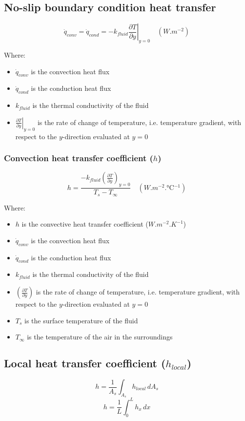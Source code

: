 \documentclass[11pt]{article}
\begin{document}
\subsection{No-slip boundary condition heat transfer}
\label{sec:orgc209fd6}
\[\dot{q}_{conv} = \dot{q}_{cond} = - k_{fluid} \left. \frac{\partial T}{\partial y} \right|_{y = 0} \quad (\unit{W.m^{-2}})\]

Where:
\begin{itemize}
\item \(\dot{q}_{conv}\) is the convection heat flux
\item \(\dot{q}_{cond}\) is the conduction heat flux
\item \(k_{fluid}\) is the thermal conductivity of the fluid
\item \(\left. \frac{\partial T}{\partial y} \right|_{y = 0}\) is the rate of change of temperature, i.e. temperature gradient, with respect to the \(y\)-direction evaluated at \(y = 0\)
\end{itemize}
\subsubsection{Convection heat transfer coefficient (\(h\))}
\label{sec:orgf4f2e16}
\[h = \frac{-k_{fluid} \left(\frac{\partial T}{\partial y} \right)_{y=0}}{T_s - T_{\infty}} \quad (\unit{W.m^{-2}.\degreeCelsius^{-1}})\]

Where:
\begin{itemize}
\item \(h\) is the convective heat transfer coefficient (\(\unit{W.m^{-2}.K^{-1}}\))
\item \(\dot{q}_{conv}\) is the convection heat flux
\item \(\dot{q}_{cond}\) is the conduction heat flux
\item \(k_{fluid}\) is the thermal conductivity of the fluid
\item \(\left(\frac{\partial T}{\partial y} \right)\) is the rate of change of temperature, i.e. temperature gradient, with respect to the \(y\)-direction evaluated at \(y = 0\)
\item \(T_s\) is the surface temperature of the fluid
\item \(T_{\infty}\) is the temperature of the air in the surroundings
\end{itemize}

 \newpage
\subsection{Local heat transfer coefficient (\(h_{local}\))}
\label{sec:orgcfeaf37}
\[h = \frac{1}{A_s} \int_{A_s} h_{local} \, dA_s\]
\[h = \frac{1}{L} \int_0^L h_x \, dx\]
\end{document}
